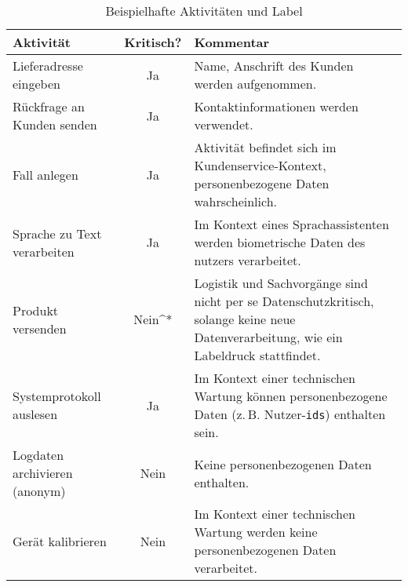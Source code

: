 \begin{table}[htbp]
    \centering
    \caption{Beispielhafte Aktivitäten und Label}
    \begin{tabularx}{\textwidth}{p{} c p{}}
        \toprule
        Aktivität & Kritisch? & Kommentar \\
        \midrule
        Lieferadresse eingeben & Ja & Name, Anschrift des Kunden werden aufgenommen. \\
        Rückfrage an Kunden senden & Ja & Kontaktinformationen werden verwendet. \\
        Fall anlegen & Ja & Aktivität befindet sich im Kundenservice-Kontext, personenbezogene Daten wahrscheinlich. \\
        Sprache zu Text verarbeiten & Ja & Im Kontext eines Sprachassistenten werden biometrische Daten des nutzers verarbeitet. \\
        Produkt versenden & Nein^* & Logistik und Sachvorgänge sind nicht per se Datenschutzkritisch, solange keine neue Datenverarbeitung, wie ein Labeldruck stattfindet. \\
        Systemprotokoll auslesen & Ja & Im Kontext einer technischen Wartung können personenbezogene Daten (z.\,B. Nutzer-\texttt{ids}) enthalten sein. \\
        Logdaten archivieren (anonym) & Nein & Keine personenbezogenen Daten enthalten. \\
        Gerät kalibrieren & Nein & Im Kontext einer technischen Wartung werden keine personenbezogenen Daten verarbeitet. \\
        \bottomrule
    \end{tabularx}
    \label{tab:labeling-examples}
\end{table}